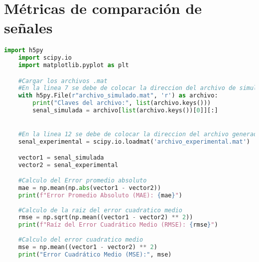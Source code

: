 \chapter{Métricas de comparación de señales}
\label{apx:comparacion_de_sennales_programa}

\begin{lstlisting}[language=python, caption={Métricas de comparación de señales}, label=lst:comparacion_de_senales_sim_vs_exp]
    import h5py
    import scipy.io
    import matplotlib.pyplot as plt

    #Cargar los archivos .mat
    #En la linea 7 se debe de colocar la direccion del archivo de simulacion generado por MATLAB
    with h5py.File(r"archivo_simulado.mat", 'r') as archivo:
        print("Claves del archivo:", list(archivo.keys()))
        senal_simulada = archivo[list(archivo.keys())[0]][:]


    #En la linea 12 se debe de colocar la direccion del archivo generado al ejecutar el programa en el ZedBoard
    senal_experimental = scipy.io.loadmat('archivo_experimental.mat')

    vector1 = senal_simulada  
    vector2 = senal_experimental  

    #Calculo del Error promedio absoluto
    mae = np.mean(np.abs(vector1 - vector2))
    print(f"Error Promedio Absoluto (MAE): {mae}")
    
    #Calculo de la raiz del error cuadratico medio
    rmse = np.sqrt(np.mean((vector1 - vector2) ** 2))
    print(f"Raíz del Error Cuadrático Medio (RMSE): {rmse}")
    
    #Calculo del error cuadratico medio
    mse = np.mean((vector1 - vector2) ** 2)
    print("Error Cuadrático Medio (MSE):", mse)
\end{lstlisting}